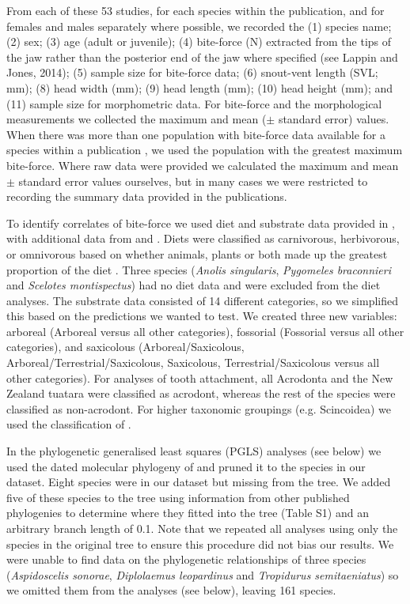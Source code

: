 \documentclass[a4paper, 12pt]{article}
\begin{document}
From each of these 53 studies, for each species within the publication, and for females and males separately where possible, we recorded the (1) species name; (2) sex; (3) age (adult or juvenile); (4) bite-force (N) extracted from the tips of the jaw rather than the posterior end of the jaw where specified (see Lappin and Jones, 2014); (5) sample size for bite-force data; (6) snout-vent length (SVL; mm); (8) head width (mm); (9) head length (mm); (10) head height (mm); and (11) sample size for morphometric data. For bite-force and the morphological measurements we collected the maximum and mean ($\pm$ standard error) values. 
When there was more than one population with bite-force data available for a species within a publication \citep[e.g.][]{lopez2015sex,massetti2017morphological,sagonas2014insularity}, we used the population with the greatest maximum bite-force. 
Where raw data were provided \citep[e.g.][]{dufour2018ecological,vzagar2017towards} we calculated the maximum and mean $\pm$ standard error values ourselves, but in many cases we were restricted to recording the summary data provided in the publications.

To identify correlates of bite-force we used diet and substrate data provided in \citet{meiri2018traits}, with additional data from \citet{metzger2005correlations} and \citet{cooper2002distribution}. 
Diets were classified as carnivorous, herbivorous, or omnivorous based on whether animals, plants or both made up the greatest proportion of the diet \citep{meiri2018traits}.
Three species (\textit{Anolis singularis}, \textit{Pygomeles braconnieri} and \textit{Scelotes montispectus}) had no diet data and were excluded from the diet analyses. 
The substrate data \citep{meiri2018traits} consisted of 14 different categories, so we simplified this based on the predictions we wanted to test. 
We created three new variables: arboreal (Arboreal versus all other categories), fossorial (Fossorial versus all other categories), and saxicolous (Arboreal/Saxicolous, Arboreal/Terrestrial/Saxicolous, Saxicolous, Terrestrial/Saxicolous versus all other categories). 
For analyses of tooth attachment, all Acrodonta and the New Zealand tuatara were classified as acrodont, whereas the rest of the species were classified as non-acrodont. 
For higher taxonomic groupings (e.g. Scincoidea) we used the classification of \citet{burbrink2020interrogating}.

In the phylogenetic generalised least squares (PGLS) analyses (see below) we used the dated molecular phylogeny of \citet{wright2015came} and pruned it to the species in our dataset. Eight species were in our dataset but missing from the tree. We added five of these species to the tree using information from other published phylogenies to determine where they fitted into the tree (Table S1) and an arbitrary branch length of 0.1. 
Note that we repeated all analyses using only the species in the original tree to ensure this procedure did not bias our results. We were unable to find data on the phylogenetic relationships of three species (\textit{Aspidoscelis sonorae}, \textit{Diplolaemus leopardinus} and \textit{Tropidurus semitaeniatus}) so we omitted them from the analyses (see below), leaving 161 species.
\end{document}
